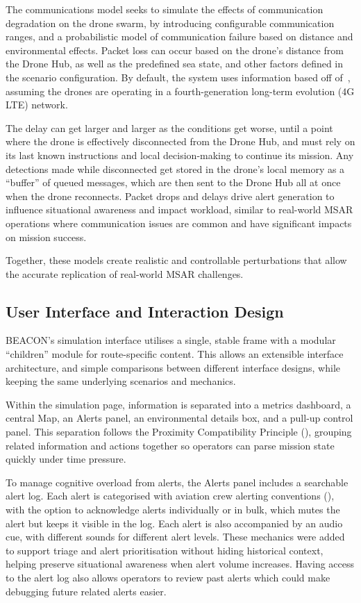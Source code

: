 The communications model seeks to simulate the effects of communication degradation on the drone swarm, by introducing configurable communication ranges, and a probabilistic model of communication failure based on distance and environmental effects.
Packet loss can occur based on the drone's distance from the Drone Hub, as well as the predefined sea state, and other factors defined in the scenario configuration.
By default, the system uses information based off of~\cite{s21082848}, assuming the drones are operating in a fourth-generation long-term evolution (4G LTE) network.

The delay can get larger and larger as the conditions get worse, until a point where the drone is effectively disconnected from the Drone Hub, and must rely on its last known instructions and local decision-making to continue its mission.
Any detections made while disconnected get stored in the drone's local memory as a ``buffer'' of queued messages, which are then sent to the Drone Hub all at once when the drone reconnects.
Packet drops and delays drive alert generation to influence situational awareness and impact workload, similar to real-world MSAR operations where communication issues are common and have significant impacts on mission success.

Together, these models create realistic and controllable perturbations that allow the accurate replication of real-world MSAR challenges.

\subsection{User Interface and Interaction Design}\label{subsec:user-interface-and-interaction-design}

BEACON's simulation interface utilises a single, stable frame with a modular ``children'' module for route-specific content.
This allows an extensible interface architecture, and simple comparisons between different interface designs, while keeping the same underlying scenarios and mechanics.

Within the simulation page, information is separated into a metrics dashboard, a central Map, an Alerts panel, an environmental details box, and a pull-up control panel.
This separation follows the Proximity Compatibility Principle (\cite{doi:10.1518/001872095779049408}), grouping related information and actions together so operators can parse mission state quickly under time pressure.

To manage cognitive overload from alerts, the Alerts panel includes a searchable alert log.
Each alert is categorised with aviation crew alerting conventions (\cite{RN3}), with the option to acknowledge alerts individually or in bulk, which mutes the alert but keeps it visible in the log.
Each alert is also accompanied by an audio cue, with different sounds for different alert levels.
These mechanics were added to support triage and alert prioritisation without hiding historical context, helping preserve situational awareness when alert volume increases.
Having access to the alert log also allows operators to review past alerts which could make debugging future related alerts easier.

